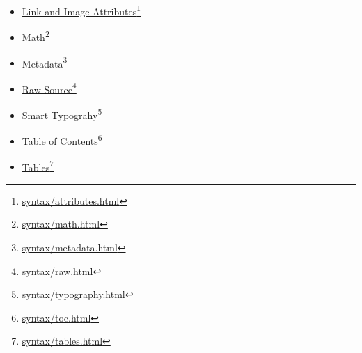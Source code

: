 \begin{itemize}
\begin{itemize}
\item \href{syntax/attributes.html}{Link and Image Attributes}\footnote{\href{syntax/attributes.html}{syntax\slash attributes.html}}

\item \href{syntax/math.html}{Math}\footnote{\href{syntax/math.html}{syntax\slash math.html}}

\item \href{syntax/metadata.html}{Metadata}\footnote{\href{syntax/metadata.html}{syntax\slash metadata.html}}

\item \href{syntax/raw.html}{Raw Source}\footnote{\href{syntax/raw.html}{syntax\slash raw.html}}

\item \href{syntax/typography.html}{Smart Typograhy}\footnote{\href{syntax/typography.html}{syntax\slash typography.html}}

\item \href{syntax/toc.html}{Table of Contents}\footnote{\href{syntax/toc.html}{syntax\slash toc.html}}

\item \href{syntax/tables.html}{Tables}\footnote{\href{syntax/tables.html}{syntax\slash tables.html}}

\end{itemize}

\end{itemize}



